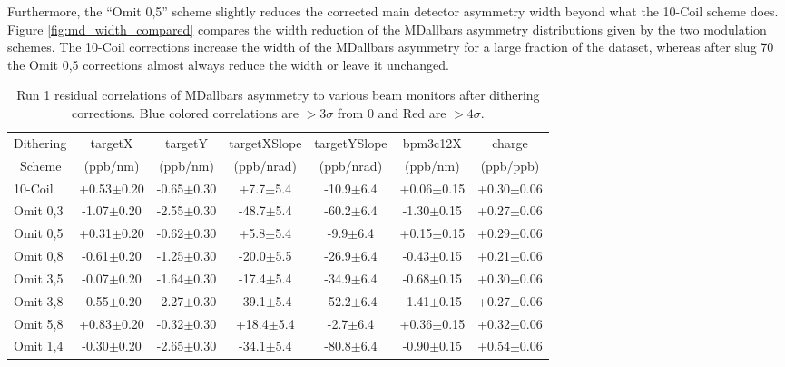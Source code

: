 Furthermore, the ``Omit 0,5'' scheme slightly reduces the corrected main detector asymmetry width beyond what the 10-Coil scheme does. Figure \ref{fig:md_width_compared} compares the width reduction of the MDallbars asymmetry distributions given by the two modulation schemes. The 10-Coil corrections increase the width of the MDallbars asymmetry for a large fraction of the \Qs dataset, whereas after slug 70 the Omit 0,5 corrections almost always reduce the width or leave it unchanged.
\begin{landscape}
\begin{table}[!h]

\caption{Run 1 residual correlations of MDallbars asymmetry to various beam monitors after dithering corrections. Blue colored correlations are $>3\sigma$ from 0 and Red are  $>4\sigma$.}
\begin{center}
\begin{tabular}[h]{|l|c|c|c|c|c|c|}\hline
Dithering&targetX&targetY&targetXSlope&targetYSlope&bpm3c12X&charge\\
~Scheme&(ppb/nm)&(ppb/nm)&(ppb/nrad)&(ppb/nrad)&(ppb/nm)&(ppb/ppb)\\\hline
10-Coil& +0.53$\pm$0.20& -0.65$\pm$0.30& +7.7$\pm$5.4& -10.9$\pm$6.4& +0.06$\pm$0.15& \color{red}+0.30$\pm$0.06\\\hline
Omit 0,3& \color{red}-1.07$\pm$0.20& \color{red}-2.55$\pm$0.30& \color{red}-48.7$\pm$5.4& \color{red}-60.2$\pm$6.4& \color{red}-1.30$\pm$0.15& \color{red}+0.27$\pm$0.06\\\hline
Omit 0,5& +0.31$\pm$0.20& -0.62$\pm$0.30& +5.8$\pm$5.4& -9.9$\pm$6.4& +0.15$\pm$0.15& \color{red}+0.29$\pm$0.06\\\hline
Omit 0,8& \color{blue}-0.61$\pm$0.20& \color{red}-1.25$\pm$0.30& \color{blue}-20.0$\pm$5.5& \color{red}-26.9$\pm$6.4& -0.43$\pm$0.15& \color{blue}+0.21$\pm$0.06\\\hline
Omit 3,5& -0.07$\pm$0.20& \color{red}-1.64$\pm$0.30& \color{blue}-17.4$\pm$5.4& \color{red}-34.9$\pm$6.4& \color{red}-0.68$\pm$0.15& \color{red}+0.30$\pm$0.06\\\hline
Omit 3,8& -0.55$\pm$0.20& \color{red}-2.27$\pm$0.30& \color{red}-39.1$\pm$5.4& \color{red}-52.2$\pm$6.4& \color{red}-1.41$\pm$0.15& \color{red}+0.27$\pm$0.06\\\hline
Omit 5,8& \color{red}+0.83$\pm$0.20& -0.32$\pm$0.30& \color{blue}+18.4$\pm$5.4& -2.7$\pm$6.4& +0.36$\pm$0.15& \color{red}+0.32$\pm$0.06\\\hline
Omit 1,4& -0.30$\pm$0.20& \color{red}-2.65$\pm$0.30& \color{red}-34.1$\pm$5.4& \color{red}-80.8$\pm$6.4& \color{red}-0.90$\pm$0.15& \color{red}+0.54$\pm$0.06\\\hline

\end{tabular}
\end{center}
\end{table}
\end{landscape}
